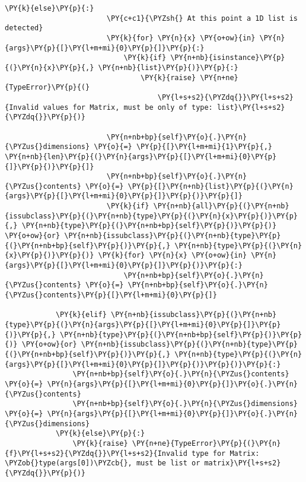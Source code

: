\begin{Verbatim}[commandchars=\\\{\}]
                    \PY{k}{else}\PY{p}{:}
                        \PY{c+c1}{\PYZsh{} At this point a 1D list is detected}
                        \PY{k}{for} \PY{n}{x} \PY{o+ow}{in} \PY{n}{args}\PY{p}{[}\PY{l+m+mi}{0}\PY{p}{]}\PY{p}{:}
                            \PY{k}{if} \PY{n+nb}{isinstance}\PY{p}{(}\PY{n}{x}\PY{p}{,} \PY{n+nb}{list}\PY{p}{)}\PY{p}{:}
                                \PY{k}{raise} \PY{n+ne}{TypeError}\PY{p}{(}
                                    \PY{l+s+s2}{\PYZdq{}}\PY{l+s+s2}{Invalid values for Matrix, must be only of type: list}\PY{l+s+s2}{\PYZdq{}}\PY{p}{)}

                        \PY{n+nb+bp}{self}\PY{o}{.}\PY{n}{\PYZus{}dimensions} \PY{o}{=} \PY{p}{[}\PY{l+m+mi}{1}\PY{p}{,} \PY{n+nb}{len}\PY{p}{(}\PY{n}{args}\PY{p}{[}\PY{l+m+mi}{0}\PY{p}{]}\PY{p}{)}\PY{p}{]}
                        \PY{n+nb+bp}{self}\PY{o}{.}\PY{n}{\PYZus{}contents} \PY{o}{=} \PY{p}{[}\PY{n+nb}{list}\PY{p}{(}\PY{n}{args}\PY{p}{[}\PY{l+m+mi}{0}\PY{p}{]}\PY{p}{)}\PY{p}{]}
                        \PY{k}{if} \PY{n+nb}{all}\PY{p}{(}\PY{n+nb}{issubclass}\PY{p}{(}\PY{n+nb}{type}\PY{p}{(}\PY{n}{x}\PY{p}{)}\PY{p}{,} \PY{n+nb}{type}\PY{p}{(}\PY{n+nb+bp}{self}\PY{p}{)}\PY{p}{)} \PY{o+ow}{or} \PY{n+nb}{issubclass}\PY{p}{(}\PY{n+nb}{type}\PY{p}{(}\PY{n+nb+bp}{self}\PY{p}{)}\PY{p}{,} \PY{n+nb}{type}\PY{p}{(}\PY{n}{x}\PY{p}{)}\PY{p}{)} \PY{k}{for} \PY{n}{x} \PY{o+ow}{in} \PY{n}{args}\PY{p}{[}\PY{l+m+mi}{0}\PY{p}{]}\PY{p}{)}\PY{p}{:}
                            \PY{n+nb+bp}{self}\PY{o}{.}\PY{n}{\PYZus{}contents} \PY{o}{=} \PY{n+nb+bp}{self}\PY{o}{.}\PY{n}{\PYZus{}contents}\PY{p}{[}\PY{l+m+mi}{0}\PY{p}{]}

            \PY{k}{elif} \PY{n+nb}{issubclass}\PY{p}{(}\PY{n+nb}{type}\PY{p}{(}\PY{n}{args}\PY{p}{[}\PY{l+m+mi}{0}\PY{p}{]}\PY{p}{)}\PY{p}{,} \PY{n+nb}{type}\PY{p}{(}\PY{n+nb+bp}{self}\PY{p}{)}\PY{p}{)} \PY{o+ow}{or} \PY{n+nb}{issubclass}\PY{p}{(}\PY{n+nb}{type}\PY{p}{(}\PY{n+nb+bp}{self}\PY{p}{)}\PY{p}{,} \PY{n+nb}{type}\PY{p}{(}\PY{n}{args}\PY{p}{[}\PY{l+m+mi}{0}\PY{p}{]}\PY{p}{)}\PY{p}{)}\PY{p}{:}
                \PY{n+nb+bp}{self}\PY{o}{.}\PY{n}{\PYZus{}contents} \PY{o}{=} \PY{n}{args}\PY{p}{[}\PY{l+m+mi}{0}\PY{p}{]}\PY{o}{.}\PY{n}{\PYZus{}contents}
                \PY{n+nb+bp}{self}\PY{o}{.}\PY{n}{\PYZus{}dimensions} \PY{o}{=} \PY{n}{args}\PY{p}{[}\PY{l+m+mi}{0}\PY{p}{]}\PY{o}{.}\PY{n}{\PYZus{}dimensions}
            \PY{k}{else}\PY{p}{:}
                \PY{k}{raise} \PY{n+ne}{TypeError}\PY{p}{(}\PY{n}{f}\PY{l+s+s2}{\PYZdq{}}\PY{l+s+s2}{Invalid type for Matrix: \PYZob{}type(args[0])\PYZcb{}, must be list or matrix}\PY{l+s+s2}{\PYZdq{}}\PY{p}{)}


\end{Verbatim}
